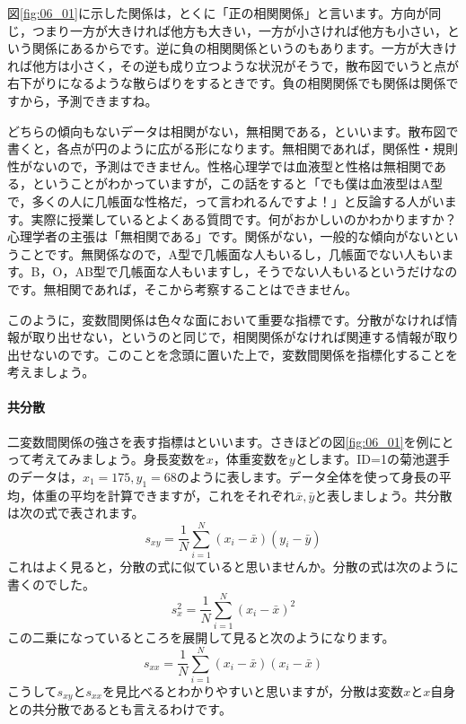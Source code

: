 \documentclass{ltjsbook}
\begin{document}
図\ref{fig:06_01}に示した関係は，とくに「正の相関関係」と言います。方向が同じ，つまり一方が大きければ他方も大きい，一方が小さければ他方も小さい，という関係にあるからです。逆に負の相関関係というのもあります。一方が大きければ他方は小さく，その逆も成り立つような状況がそうで，散布図でいうと点が右下がりになるような散らばりをするときです。負の相関関係でも関係は関係ですから，予測できますね。

どちらの傾向もないデータは相関がない，無相関である，といいます。散布図で書くと，各点が円のように広がる形になります。無相関であれば，関係性・規則性がないので，予測はできません。性格心理学では血液型と性格は無相関である，ということがわかっていますが，この話をすると「でも僕は血液型はA型で，多くの人に几帳面な性格だ，って言われるんですよ！」と反論する人がいます。実際に授業しているとよくある質問です。何がおかしいのかわかりますか？ 心理学者の主張は「無相関である」です。関係がない，一般的な傾向がないということです。無関係なので，A型で几帳面な人もいるし，几帳面でない人もいます。B，O，AB型で几帳面な人もいますし，そうでない人もいるというだけなのです。無相関であれば，そこから考察することはできません。

このように，変数間関係は色々な面において重要な指標です。分散がなければ情報が取り出せない，というのと同じで，相関関係がなければ関連する情報が取り出せないのです。このことを念頭に置いた上で，変数間関係を指標化することを考えましょう。

\paragraph{共分散}二変数間関係の強さを表す指標はといいます。さきほどの図\ref{fig:06_01}を例にとって考えてみましょう。身長変数を$x$，体重変数を$y$とします。ID=1の菊池選手のデータは，$x_1= 175,y_1=68$のように表します。データ全体を使って身長の平均，体重の平均を計算できますが，これをそれぞれ$\bar{x},\bar{y}$と表しましょう。共分散は次の式で表されます。
\[ s_{xy} = \frac{1}{N}\sum_{i=1}^N (x_i - \bar{x})(y_i - \bar{y}) \label{ref:covariance}\]
これはよく見ると，分散の式に似ていると思いませんか。分散の式は次のように書くのでした。
\[ s_{x}^2 = \frac{1}{N}\sum_{i=1}^N (x_i - \bar{x})^2 \]
この二乗になっているところを展開して見ると次のようになります。
\[ s_{xx} = \frac{1}{N}\sum_{i=1}^N (x_i - \bar{x})(x_i - \bar{x}) \]
こうして$s_{xy}$と$s_{xx}$を見比べるとわかりやすいと思いますが，分散は変数$x$と$x$自身との共分散であるとも言えるわけです。
\end{document}
